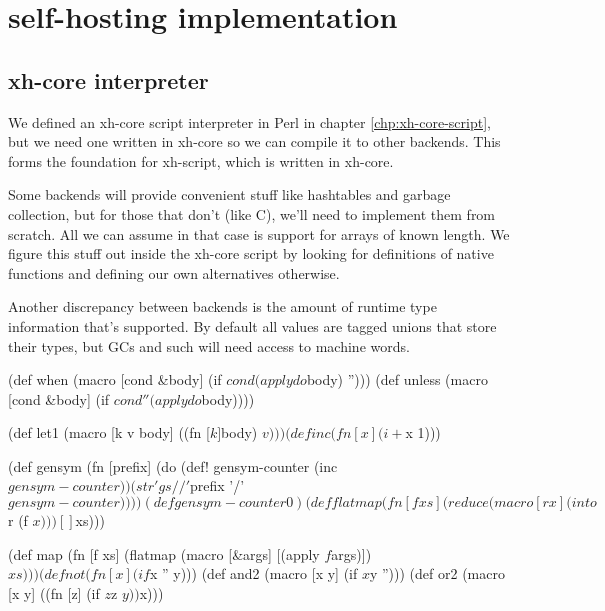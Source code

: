 \documentclass{report}
\begin{document}
\part{self-hosting implementation}\label{part:self-hosting-implementation}
\chapter{xh-core interpreter}\label{chp:xh-core-self-hosting}
  We defined an xh-core script interpreter in Perl in chapter
  \ref{chp:xh-core-script}, but we need one written in xh-core so we can
  compile it to other backends. This forms the foundation for xh-script, which
  is written in xh-core.

  Some backends will provide convenient stuff like hashtables and garbage
  collection, but for those that don't (like C), we'll need to implement them
  from scratch. All we can assume in that case is support for arrays of known
  length. We figure this stuff out inside the xh-core script by looking for
  definitions of native functions and defining our own alternatives otherwise.

  Another discrepancy between backends is the amount of runtime type
  information that's supported. By default all values are tagged unions that
  store their types, but GCs and such will need access to machine words.

\begin{xhcode}
(def when   (macro [cond &body] (if $cond (apply do $body) '')))
(def unless (macro [cond &body] (if $cond '' (apply do $body))))

(def let1 (macro [k v body] ((fn [$k] $body) $v)))
(def inc (fn [x] (i+ $x 1)))

(def gensym
  (fn [prefix]
    (do
      (def! gensym-counter (inc $gensym-counter))
      (str 'gs//' $prefix '/' $gensym-counter))))
(def gensym-counter 0)

(def flatmap
  (fn [f xs]
    (reduce (macro [r x] (into $r (f $x)))
            []
            $xs)))

(def map
  (fn [f xs]
    (flatmap (macro [&args] [(apply $f $args)]) $xs)))

(def not  (fn    [x]   (if $x '' y)))
(def and2 (macro [x y] (if $x $y '')))
(def or2  (macro [x y] ((fn [z] (if $z $z $y)) $x))) \end{xhcode}
\end{document}
